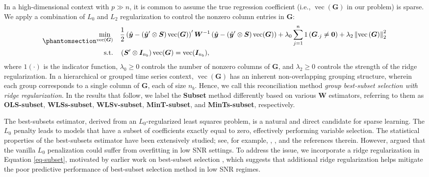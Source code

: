 \documentclass[
  11pt]{article}
\theoremstyle{plain}
\theoremstyle{remark}
\begin{document}
In a high-dimensional context with \(p \gg n\), it is common to assume
the true regression coefficient (i.e., \(\operatorname{vec}(\bm{G})\) in
our problem) is sparse. We apply a combination of \(L_0\) and \(L_2\)
regularization to control the nonzero column entries in \(\bm{G}\):
\begin{equation}\phantomsection\label{eq-subset}{ \begin{aligned}
\min_{\operatorname{vec}(\bm{G})} \quad & \frac{1}{2}\left(\hat{\bm{y}}-\left(\hat{\bm{y}}^{\prime} \otimes \bm{S}\right) \operatorname{vec}(\bm{G})\right)^{\prime} \bm{W}^{-1}\left(\hat{\bm{y}}-\left(\hat{\bm{y}}^{\prime} \otimes \bm{S}\right) \operatorname{vec}(\bm{G})\right) + \lambda_0 \sum_{j=1}^n 1\left(\bm{G}_{\cdot j} \neq \bm{0}\right) + \lambda_2 \left\|\operatorname{vec}\left(\bm{G}\right)\right\|_2^2 \\
\text{s.t.} \quad & \left(\bm{S}^{\prime} \otimes \bm{I}_{n_b}\right) \operatorname{vec}(\bm{G})=\operatorname{vec}(\bm{I}_{n_b}),
\end{aligned}
}\end{equation} where \(1(\cdot)\) is the indicator function,
\(\lambda_0 \geq 0\) controls the number of nonzero columns of
\(\bm{G}\), and \(\lambda_2 \geq 0\) controls the strength of the ridge
regularization. In a hierarchical or grouped time series context,
\(\operatorname{vec}(\bm{G})\) has an inherent non-overlapping grouping
structure, wherein each group corresponds to a single column of
\(\bm{G}\), each of size \(n_b\). Hence, we call this reconciliation
method \emph{group best-subset selection with ridge regularization}. In
the results that follow, we label the \textbf{Subset} method differently
based on various \(\bm{W}\) estimators, referring to them as
\textbf{OLS-subset}, \textbf{WLSs-subset}, \textbf{WLSv-subset},
\textbf{MinT-subset}, and \textbf{MinTs-subset}, respectively.

The best-subsets estimator, derived from an \(L_0\)-regularized least
squares problem, is a natural and direct candidate for sparse learning.
The \(L_0\) penalty leads to models that have a subset of coefficients
exactly equal to zero, effectively performing variable selection. The
statistical properties of the best-subsets estimator have been
extensively studied; see, for example, \citet{Greenshtein2004-be},
\citet{Zhang2012-ge}, and the references therein. However,
\citet{Mazumder2022-hx} argued that the vanilla \(L_0\) penalization
could suffer from overfitting in low SNR settings. To address the issue,
we incorporate a ridge regularization in Equation \eqref{eq-subset},
motivated by earlier work on best-subset selection
\citep[e.g.,][]{Hazimeh2020-xd, Mazumder2022-hx}, which suggests that
additional ridge regularization helps mitigate the poor predictive
performance of best-subset selection method in low SNR regimes.
\end{document}
